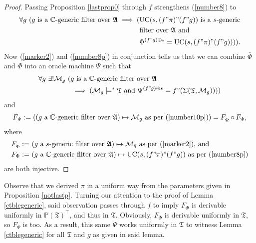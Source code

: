 \documentclass[12pt]{article}
\numberwithin{equation}{section}
\begin{document}
\begin{proof}
Passing Proposition \ref{lastprop0} through $f$ strengthens (\ref{number8}) to 
\begin{align}\label{number8p}
\begin{split}
    \forall g \ (g \text{ is a } \mathbb{C} \text{-generic filter over } \mathfrak{A} \implies ( & \mathrm{UC}(s, (f" \pi)" (f" g)) \text{ is a } s \text{-generic} \\ 
    & \text{filter over } \mathfrak{A} \text{ and} \\
    & \Phi^{(f" g) \oplus s} = \mathrm{UC}(s, (f" \pi)" (f" g)))) \text{.}
\end{split}
\end{align}
Now (\ref{marker2}) and (\ref{number8p}) in conjunction tells us that we can combine $\bar{\Phi}$ and $\Phi$ into an oracle machine $\Psi$ such that
\begin{align}\label{number10p}
\begin{split}
    \forall g \ \exists ! \mathcal{M}_g \ ( & g \text{ is a } \mathbb{C} \text{-generic filter over } \mathfrak{A} \\ 
    & \implies (\mathcal{M}_g \models^* \mathfrak{T} \text{ and } \Psi^{(f" g) \oplus s} = f" (\Sigma(\mathfrak{T}, \mathcal{M}_g))))
\end{split}
\end{align}
and
\begin{align*}
    F_{\Psi} := ((g \text{ a } \mathbb{C} \text{-generic filter over } \mathfrak{A}) \mapsto \mathcal{M}_g \text{ as per (\ref{number10p})}) = F_{\bar{\Phi}} \circ F_{\Phi} \text{,}
\end{align*}
where
\begin{align*}
    F_{\bar{\Phi}} := \ & (\bar{g} \text{ a } s \text{-generic filter over } \mathfrak{A}) \mapsto \mathcal{M}_{\bar{g}} \text{ as per (\ref{marker2}), and} \\
    F_{\Phi} := \ & (g \text{ a } \mathbb{C} \text{-generic filter over } \mathfrak{A}) \mapsto \mathrm{UC}(s, (f" \pi)" (f" g)) \text{ as per (\ref{number8p})}
\end{align*}
are both injective. 
\end{proof}

\begin{rem}\label{lastrem}
Observe that we derived $\pi$ in a uniform way from the parameters given in Proposition \ref{notlastp}. Turning our attention to the proof of Lemma \ref{ctblegeneric}, said observation passes through $f$ to imply $F_{\Phi}$ is derivable uniformly in $\mathbb{P}(\mathfrak{T})^{\top}$, and thus in $\mathfrak{T}$. Obviously, $F_{\bar{\Phi}}$ is derivable uniformly in $\mathfrak{T}$, so $F_{\Psi}$ is too. As a result, this same $\Psi$ works uniformly in $\mathfrak{T}$ to witness Lemma \ref{ctblegeneric} for all $\mathfrak{T}$ and $g$ as given in said lemma.
\end{rem}
\end{document}
